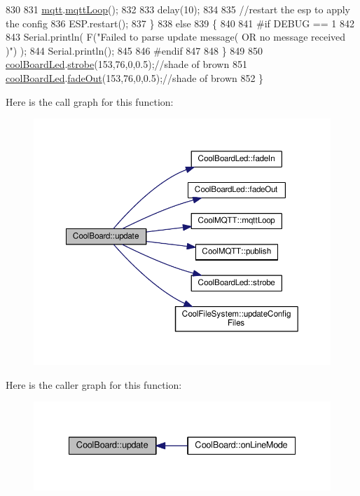 \begin{DoxyCode}
830             
831             \hyperlink{classCoolBoard_a2399f44d7c23c1149a335cb3b46d90f1}{mqtt}.\hyperlink{classCoolMQTT_aa5eaae967b562b62cbcf2b8d81f6e5d5}{mqttLoop}();
832 
833             delay(10);
834             
835             \textcolor{comment}{//restart the esp to apply the config}
836             ESP.restart();
837     \}
838     \textcolor{keywordflow}{else}
839     \{
840     
841 \textcolor{preprocessor}{    #if DEBUG == 1}
842 
843         Serial.println( F(\textcolor{stringliteral}{"Failed to parse update message( OR no message received )"}) );
844         Serial.println();
845     
846 \textcolor{preprocessor}{    #endif}
847     
848     \}
849 
850     \hyperlink{classCoolBoard_a1b1d3c684a5baa56b08486e192fd8e97}{coolBoardLed}.\hyperlink{classCoolBoardLed_ad5f0de4c628cbfbf49896042831c64ad}{strobe}(153,76,0,0.5);\textcolor{comment}{//shade of brown}
851     \hyperlink{classCoolBoard_a1b1d3c684a5baa56b08486e192fd8e97}{coolBoardLed}.\hyperlink{classCoolBoardLed_a93d545679237e8cc858324367149775c}{fadeOut}(153,76,0,0.5);\textcolor{comment}{//shade of brown                              }
852 \}
\end{DoxyCode}
Here is the call graph for this function\+:\nopagebreak
\begin{figure}[H]
\begin{center}
\leavevmode
\includegraphics[width=350pt]{classCoolBoard_a8612756d3f73198cdde857a66f0fe690_cgraph}
\end{center}
\end{figure}
Here is the caller graph for this function\+:\nopagebreak
\begin{figure}[H]
\begin{center}
\leavevmode
\includegraphics[width=335pt]{classCoolBoard_a8612756d3f73198cdde857a66f0fe690_icgraph}
\end{center}
\end{figure}
